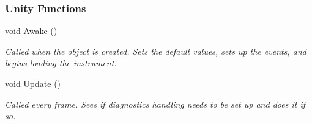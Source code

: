 \subsubsection*{Unity Functions}
\begin{DoxyCompactItemize}
\item 
\mbox{\label{group___virtual_instrument_manager_ab92bac4e22476ffe39fc40f49fbd6ae5}} 
void \hyperlink{group___virtual_instrument_manager_ab92bac4e22476ffe39fc40f49fbd6ae5}{Awake} ()
\begin{DoxyCompactList}\small\item\em Called when the object is created. Sets the default values, sets up the events, and begins loading the instrument. \end{DoxyCompactList}\item 
\mbox{\label{group___virtual_instrument_manager_ac10dc6a13185a6ab7c658a6f96b02998}} 
void \hyperlink{group___virtual_instrument_manager_ac10dc6a13185a6ab7c658a6f96b02998}{Update} ()
\begin{DoxyCompactList}\small\item\em Called every frame. Sees if diagnostics handling needs to be set up and does it if so. \end{DoxyCompactList}\end{DoxyCompactItemize}
